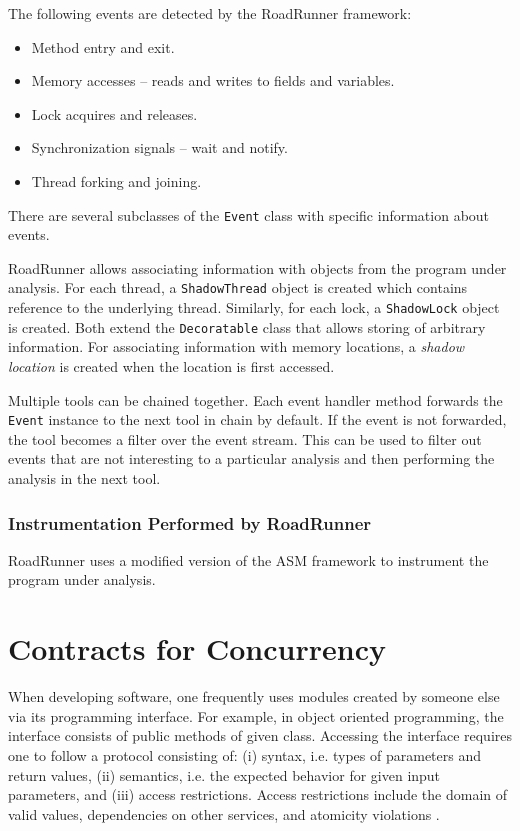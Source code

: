 The following events are detected by the RoadRunner framework:
\begin{itemize}
    \item Method entry and exit.
    \item Memory accesses -- reads and writes to fields and variables.
    \item Lock acquires and releases.
    \item Synchronization signals -- wait and notify.
    \item Thread forking and joining.
\end{itemize}

There are several subclasses of the \texttt{Event} class with specific
information about events.

RoadRunner allows associating information with objects from the program under
analysis. For each thread, a \texttt{ShadowThread} object is created which
contains reference to the underlying thread. Similarly, for each lock, a
\texttt{ShadowLock} object is created. Both extend the \texttt{Decoratable}
class that allows storing of arbitrary information. For associating information
with memory locations, a \emph{shadow location} is created when the location is
first accessed.

Multiple tools can be chained together. Each event handler method forwards the
\texttt{Event} instance to the next tool in chain by default. If the event is
not forwarded, the tool becomes a filter over the event stream. This can be used
to filter out events that are not interesting to a particular analysis and then
performing the analysis in the next tool.

\subsection{Instrumentation Performed by RoadRunner}

RoadRunner uses a modified version of the ASM framework to instrument the
program under analysis.




\chapter{Contracts for Concurrency}
\label{chThree}

When developing software, one frequently uses modules created by someone else
via its programming interface. For example, in object oriented programming, the
interface consists of public methods of given class. Accessing the interface
requires one to follow a protocol consisting of: (i) syntax, i.e. types of
parameters and return values, (ii) semantics, i.e. the expected behavior for
given input parameters, and (iii) access restrictions. Access restrictions
include the domain of valid values, dependencies on other services, and
atomicity violations \cite{contracts}.

